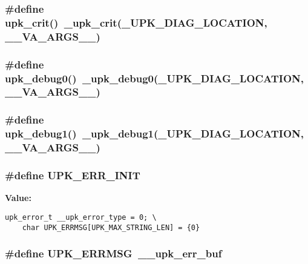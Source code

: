 \subsubsection{\setlength{\rightskip}{0pt plus 5cm}\#define upk\_\-crit()~\_\-upk\_\-crit(\_\-UPK\_\-DIAG\_\-LOCATION, \_\-\_\-VA\_\-ARGS\_\-\_\-)}\label{error_8h_ff686c96124df5c06b257fae2815f93e}


\subsubsection{\setlength{\rightskip}{0pt plus 5cm}\#define upk\_\-debug0()~\_\-upk\_\-debug0(\_\-UPK\_\-DIAG\_\-LOCATION, \_\-\_\-VA\_\-ARGS\_\-\_\-)}\label{error_8h_329df910624f74edd6fe6a9cebc5e673}


\subsubsection{\setlength{\rightskip}{0pt plus 5cm}\#define upk\_\-debug1()~\_\-upk\_\-debug1(\_\-UPK\_\-DIAG\_\-LOCATION, \_\-\_\-VA\_\-ARGS\_\-\_\-)}\label{error_8h_ca4df3ff9f9219ee65c24620e577c09f}


\subsubsection{\setlength{\rightskip}{0pt plus 5cm}\#define UPK\_\-ERR\_\-INIT}\label{error_8h_db48610aba8e7636871ab2f7494bbab0}


\textbf{Value:}

\begin{Code}\begin{verbatim}upk_error_t __upk_error_type = 0; \
    char UPK_ERRMSG[UPK_MAX_STRING_LEN] = {0}
\end{verbatim}\end{Code}
\subsubsection{\setlength{\rightskip}{0pt plus 5cm}\#define UPK\_\-ERRMSG~\_\-\_\-upk\_\-err\_\-buf}\label{error_8h_8f863380b91a8f786f849261c3611a27}


